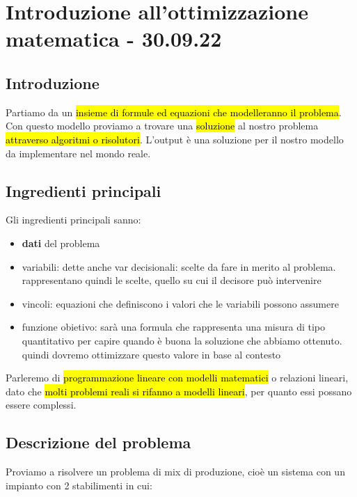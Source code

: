 \newpage
\section{Introduzione all'ottimizzazione matematica - 30.09.22}

\subsection{Introduzione}

Partiamo da un \hl{insieme di formule ed equazioni che modelleranno il problema}. Con questo modello proviamo a trovare una \hl{soluzione} al nostro problema \hl{attraverso algoritmi o risolutori}. L'output è una soluzione per il nostro modello da implementare nel mondo reale.


\subsection{Ingredienti principali}

Gli ingredienti principali sanno:

\begin{itemize}
	\item \textbf{dati} del problema
	\item variabili: dette anche var decisionali: scelte da fare in merito al problema. rappresentano quindi le scelte, quello su cui il decisore può intervenire
	\item vincoli: equazioni che definiscono i valori che le variabili possono assumere
	\item funzione obietivo: sarà una formula che rappresenta una misura di tipo quantitativo per capire quando è buona la soluzione che abbiamo ottenuto. quindi dovremo ottimizzare questo valore in base al contesto
\end{itemize}


Parleremo di \hl{programmazione lineare con modelli matematici} o relazioni lineari, dato che \hl{molti problemi reali si rifanno a modelli lineari}, per quanto essi possano essere complessi.


\subsection{Descrizione del problema}

Proviamo a risolvere un problema di mix di produzione, cioè un sistema con un impianto con 2 stabilimenti in cui:

